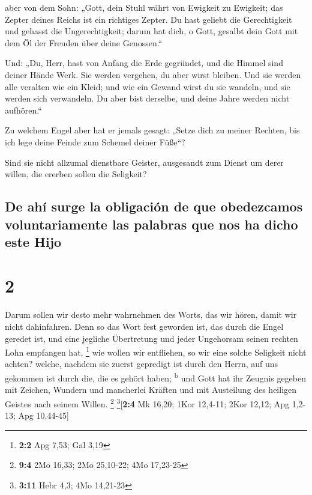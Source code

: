  aber von dem Sohn: „Gott, dein Stuhl währt von Ewigkeit
zu Ewigkeit; das Zepter deines Reichs ist ein richtiges Zepter.
 Du hast geliebt die Gerechtigkeit und gehasst die
Ungerechtigkeit; darum hat dich, o Gott, gesalbt dein Gott mit dem Öl
der Freuden über deine Genossen.``

 Und: „Du, Herr, hast von Anfang die Erde gegründet, und
die Himmel sind deiner Hände Werk.  Sie werden vergehen,
du aber wirst bleiben. Und sie werden alle veralten wie ein Kleid;
 und wie ein Gewand wirst du sie wandeln, und sie werden
sich verwandeln. Du aber bist derselbe, und deine Jahre werden nicht
aufhören.``

 Zu welchem Engel aber hat er jemals gesagt: „Setze dich
zu meiner Rechten, bis ich lege deine Feinde zum Schemel deiner Füße``?

 Sind sie nicht allzumal dienstbare Geister, ausgesandt
zum Dienst um derer willen, die ererben sollen die Seligkeit?

\hypertarget{de-ahuxed-surge-la-obligaciuxf3n-de-que-obedezcamos-voluntariamente-las-palabras-que-nos-ha-dicho-este-hijo}{%
\subsection{De ahí surge la obligación de que obedezcamos
voluntariamente las palabras que nos ha dicho este
Hijo}\label{de-ahuxed-surge-la-obligaciuxf3n-de-que-obedezcamos-voluntariamente-las-palabras-que-nos-ha-dicho-este-hijo}}

\hypertarget{section-1}{%
\section{2}\label{section-1}}

 Darum sollen wir desto mehr wahrnehmen des Worts, das wir
hören, damit wir nicht dahinfahren.  Denn so das Wort fest
geworden ist, das durch die Engel geredet ist, und eine jegliche
Übertretung und jeder Ungehorsam seinen rechten Lohn empfangen hat,
\footnote{\textbf{2:2} Apg 7,53; Gal 3,19}  wie wollen wir
entfliehen, so wir eine solche Seligkeit nicht achten? welche, nachdem
sie zuerst gepredigt ist durch den Herrn, auf uns gekommen ist durch
die, die es gehört haben; \textsuperscript{b}  und Gott
hat ihr Zeugnis gegeben mit Zeichen, Wundern und mancherlei Kräften und
mit Austeilung des heiligen Geistes nach seinem Willen. \footnote{\textbf{9:4}
  2Mo 16,33; 2Mo 25,10-22; 4Mo 17,23-25} \footnote{\textbf{3:11} Hebr
  4,3; 4Mo 14,21-23}{[}\textbf{2:4} Mk 16,20; 1Kor 12,4-11; 2Kor 12,12;
Apg 1,2-13; Apg 10,44-45{]}

